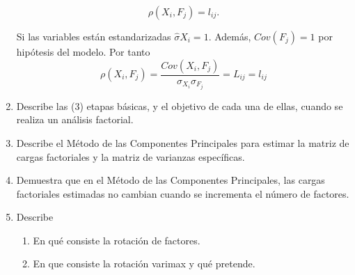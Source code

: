 \documentclass[twoside]{article}
\begin{document}
\begin{enumerate}
\[ \rho(X_i, F_j) = l_{ij}. \]

Si las variables están estandarizadas $\hat{\sigma}{X_i}=1$. Además, $Cov(F_j) = 1$ por hipótesis del modelo. Por tanto
$$
\rho(X_i,F_j) = \frac{Cov(X_i,F_j)}{\sigma_{X_i}\sigma_{F_j}} = L_{ij} = l_{ij}
$$
\item Describe las (3) etapas básicas, y el objetivo de cada una de ellas, cuando se realiza un análisis factorial.
\item Describe el Método de las Componentes Principales para estimar la matriz de cargas factoriales y la matriz de varianzas específicas.
\item Demuestra que en el Método de las Componentes Principales, las cargas factoriales estimadas no cambian cuando se incrementa el número de factores.
\item Describe
\begin{enumerate}
	\item En qué consiste la rotación de factores.
	\item En que consiste la rotación varimax y qué pretende.
\end{enumerate}
\end{enumerate}

\newpage
\end{document}
